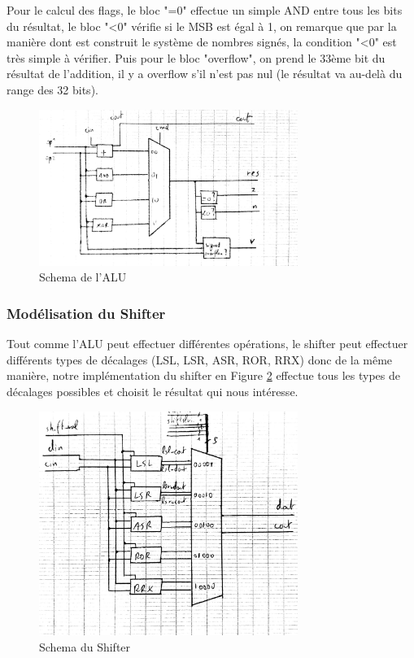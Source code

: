 \documentclass{article}
\begin{document}
Pour le calcul des flags, le bloc "=0" effectue un simple AND entre tous les bits du résultat,
le bloc "<0" vérifie si le MSB est égal à 1, on remarque que par la manière dont est construit
le système de nombres signés, la condition "<0" est très simple à vérifier. Puis pour le bloc "overflow",
on prend le 33ème bit du résultat de l'addition, il y a overflow s'il n'est pas nul (le résultat va au-delà
du range des 32 bits).

\begin{figure}[H]
\includegraphics[width=0.75\textwidth]{pics/alu.png}
\centering
\caption{Schema de l'ALU}
\label{alu}
\end{figure}

\subsubsection{Modélisation du Shifter}

Tout comme l'ALU peut effectuer différentes opérations, le shifter peut effectuer différents
types de décalages (LSL, LSR, ASR, ROR, RRX) donc de la même manière, notre implémentation
du shifter en Figure \ref{shifter} effectue tous les types de décalages possibles et choisit
le résultat qui nous intéresse.

\begin{figure}[H]
\includegraphics[width=0.75\textwidth]{pics/shifter.png}
\centering
\caption{Schema du Shifter}
\label{shifter}
\end{figure}
\end{document}
